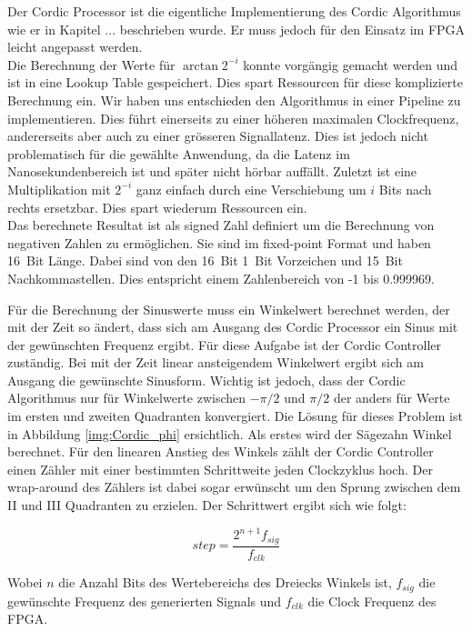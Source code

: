 Der Cordic Processor ist die eigentliche Implementierung des Cordic Algorithmus wie er in Kapitel ...  beschrieben wurde. Er muss jedoch für den Einsatz im FPGA leicht angepasst werden. \\
Die Berechnung der Werte für \(\arctan{2^{-i}}\) konnte vorgängig gemacht werden und ist in eine Lookup Table gespeichert. Dies spart Ressourcen für diese komplizierte Berechnung ein. Wir haben uns entschieden den Algorithmus in einer Pipeline zu implementieren. Dies führt einerseits zu einer höheren maximalen Clockfrequenz, andererseits aber auch zu einer grösseren Signallatenz. Dies ist jedoch nicht problematisch für die gewählte Anwendung, da die Latenz im Nanosekundenbereich ist und später nicht hörbar auffällt. Zuletzt ist eine Multiplikation mit \(2^{-i}\) ganz einfach durch eine Verschiebung um \(i\) Bits nach rechts ersetzbar. Dies spart wiederum Ressourcen ein.\\
Das berechnete Resultat ist als signed Zahl definiert um die Berechnung von negativen Zahlen zu ermöglichen. Sie sind im fixed-point Format und haben \SI{16}{Bit} Länge. Dabei sind von den \SI{16}{Bit} \SI{1}{Bit} Vorzeichen und \SI{15}{Bit} Nachkommastellen. Dies entspricht einem Zahlenbereich von -1 bis 0.999969.

Für die Berechnung der Sinuswerte muss ein Winkelwert berechnet werden, der mit der Zeit so ändert, dass sich am Ausgang des Cordic Processor ein Sinus mit der gewünschten Frequenz ergibt. Für diese Aufgabe ist der Cordic Controller zuständig. Bei mit der Zeit linear ansteigendem Winkelwert ergibt sich am Ausgang die gewünschte Sinusform. Wichtig ist jedoch, dass der Cordic Algorithmus nur für Winkelwerte zwischen  \(-\pi/2\) und \(\pi/2\) der anders für Werte im ersten und zweiten Quadranten konvergiert. Die Lösung für dieses Problem ist in Abbildung \ref{img:Cordic_phi} ersichtlich. 
Als erstes wird der Sägezahn Winkel berechnet. Für den linearen Anstieg des Winkels zählt der Cordic Controller einen Zähler mit einer bestimmten Schrittweite jeden Clockzyklus hoch. Der wrap-around des Zählers ist dabei sogar erwünscht um den Sprung zwischen dem II und III Quadranten zu erzielen. Der Schrittwert ergibt sich wie folgt:

\begin{equation}
step = \frac{2^{n+1}f_{sig}}{f_{clk}}
\label{equ:cordic_3}
\end{equation} 

Wobei \(n\) die Anzahl Bits des Wertebereichs des Dreiecks Winkels ist, \(f_{sig}\) die gewünschte Frequenz des generierten Signals und \(f_{clk}\) die Clock Frequenz des FPGA.

